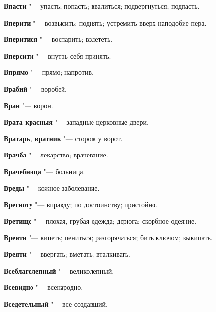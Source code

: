 \begin{mymulticols}{2}
\noindent\textbf{Впасти} "--- упасть; попасть; ввалиться; подвергнуться; подпасть. 




\noindent\textbf{Вперити} "--- возвысить; поднять; устремить вверх наподобие пера. 




\noindent\textbf{Вперитися} "--- воспарить; взлететь. 




\noindent\textbf{Вперсити} "--- внутрь себя принять. 




\noindent\textbf{Впрямо} "--- прямо; напротив. 




\noindent\textbf{Врабий} "--- воробей. 




\noindent\textbf{Вран} "--- ворон. 




\noindent\textbf{Врата красныя} "--- западные церковные двери. 




\noindent\textbf{Вратарь, вратник} "--- сторож у ворот. 




\noindent\textbf{Врачба} "--- лекарство; врачевание. 




\noindent\textbf{Врачебница} "--- больница. 




\noindent\textbf{Вреды} "--- кожное заболевание. 




\noindent\textbf{Вресноту} "--- вправду; по достоинству; пристойно. 




\noindent\textbf{Вретище} "--- плохая, грубая одежда; дерюга; скорбное одеяние. 




\noindent\textbf{Вреяти} "--- кипеть; пениться; разгорячаться; бить ключом; выкипать. 




\noindent\textbf{Вреяти} "--- ввергать; вметать; вталкивать. 




\noindent\textbf{Всеблаголепный} "--- великолепный. 




\noindent\textbf{Всевидно} "--- всенародно. 




\noindent\textbf{Вседетельный} "--- все создавший. 





\end{mymulticols}
